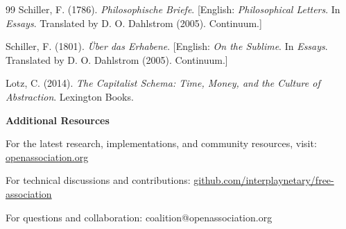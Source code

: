 \documentclass[11pt,a4paper]{article}
\theoremstyle{definition}
\theoremstyle{remark}
\begin{document}
\begin{thebibliography}{99}
Schiller, F. (1786). \textit{Philosophische Briefe}. [English: \textit{Philosophical Letters}. In \textit{Essays}. Translated by D. O. Dahlstrom (2005). Continuum.]

Schiller, F. (1801). \textit{\"Uber das Erhabene}. [English: \textit{On the Sublime}. In \textit{Essays}. Translated by D. O. Dahlstrom (2005). Continuum.]

Lotz, C. (2014). \textit{The Capitalist Schema: Time, Money, and the Culture of Abstraction}. Lexington Books.

\end{thebibliography}

\vspace{1em}
\noindent\textbf{Additional Resources}

\noindent For the latest research, implementations, and community resources, visit: \url{openassociation.org}

\noindent For technical discussions and contributions: \url{github.com/interplaynetary/free-association}

\noindent For questions and collaboration: coalition@openassociation.org
\end{document}
